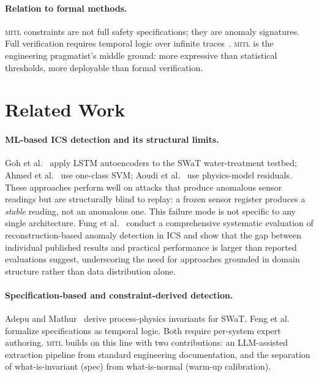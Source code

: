 \documentclass[sigconf,anonymous,review]{acmart}
\newcommand{\mitl}{\textsc{mitl}\xspace}
\begin{document}
\paragraph{Relation to formal methods.}
\mitl constraints are not full safety specifications; they are anomaly
signatures.  Full verification requires temporal logic over infinite
traces~\cite{Formalmethods}.  \mitl is the engineering pragmatist's
middle ground: more expressive than statistical thresholds, more deployable
than formal verification.

\section{Related Work}
\label{sec:related}

\paragraph{ML-based ICS detection and its structural limits.}
Goh et al.~\cite{Goh2017} apply LSTM autoencoders to the SWaT water-treatment
testbed; Ahmed et al.~\cite{Ahmed2018} use one-class SVM; Aoudi et
al.~\cite{Aoudi2018} use physics-model residuals.  These approaches perform
well on attacks that produce anomalous sensor readings but are structurally
blind to replay: a frozen sensor register produces a \emph{stable} reading,
not an anomalous one.  This failure mode is not specific to any single
architecture.  Fung et al.~\cite{Fung2022} conduct a comprehensive
systematic evaluation of reconstruction-based anomaly detection in ICS and
show that the gap between individual published results and practical
performance is larger than reported evaluations suggest, underscoring the
need for approaches grounded in domain structure rather than data
distribution alone.

\paragraph{Specification-based and constraint-derived detection.}
Adepu and Mathur~\cite{Adepu2018} derive process-physics invariants for SWaT.
Feng et al.~\cite{Feng2019} formalize specifications as temporal logic.
Both require per-system expert authoring.  \mitl builds on this line with
two contributions: an LLM-assisted extraction pipeline from standard
engineering documentation, and the separation of what-is-invariant (spec)
from what-is-normal (warm-up calibration).
\end{document}

